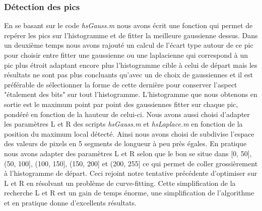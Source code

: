 \documentclass{article}
\begin{document}
\subsubsection{Détection des pics}
En se basant sur le code \textit{hsGauss.m} nous avons écrit une fonction qui permet de repérer les pics sur l'histogramme et de fitter la meilleure gaussienne dessus. Dans un deuxième temps nous avons rajouté un calcul de l'écart type autour de ce pic pour choisir entre fitter une gaussienne ou une laplacienne qui correspond à un pic plus étroit adaptant encore plus l'histogramme cible à celui de départ mais les résultats ne sont pas plus concluants qu'avec un de choix de gaussiennes et il est préférable de sélectionner la forme de cette dernière pour conserver l'aspect "étalement des bits" sur tout l'histogramme. L'histogramme que nous obtenons en sortie est le maximum point par point des gaussiennes fitter sur chaque pic, pondéré en fonction de la hauteur de celui-ci. Nous avons aussi choisi d'adapter les paramètres L et R des scripts \textit{hsGauss.m} et \textit{hsLaplace.m} en fonction de la position du maximum local détecté. Ainsi nous avons choisi de subdivise l'espace des valeurs de pixels en 5 segments de longueur à peu près égales. En pratique nous avons adapter des paramètres L et R selon que le bon se situe dans [0, 50], (50, 100], (100, 150], (150, 200] et (200, 255] ce qui permet de coller grossièrement à l'histogramme de départ. Ceci rejoint notre tentative précédente d'optimiser sur L et R en résolvant un problème de curve-fitting. Cette simplification de la recherche L et R est un gain de temps énorme, une simplification de l'algorithme et en pratique donne d'excellents résultats.
\end{document}
